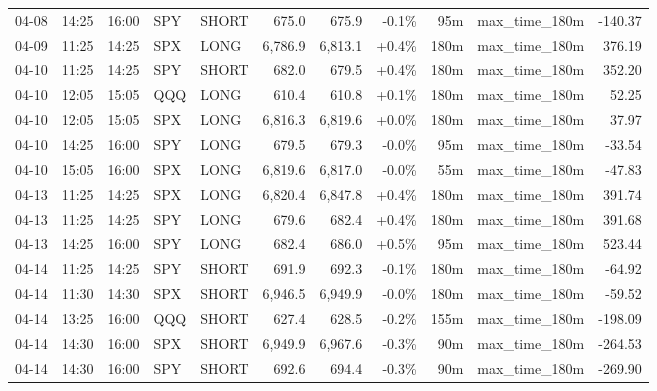 \documentclass[11pt,a4paper,twoside]{article}
\begin{document}
\begin{center}
\begin{longtable}{>{\color{txtmain}}l l l l l r r r r >{\color{txtmain}}l r}
04-08 & 14:25 & 16:00 & SPY & SHORT & 675.0 & 675.9 & \textcolor{lossred}{-0.1\%} & 95m & max\_time\_180m & \textcolor{lossred}{-140.37} \\
04-09 & 11:25 & 14:25 & SPX & LONG & 6,786.9 & 6,813.1 & \textcolor{wingreen}{+0.4\%} & 180m & max\_time\_180m & \textcolor{wingreen}{376.19} \\
04-10 & 11:25 & 14:25 & SPY & SHORT & 682.0 & 679.5 & \textcolor{wingreen}{+0.4\%} & 180m & max\_time\_180m & \textcolor{wingreen}{352.20} \\
04-10 & 12:05 & 15:05 & QQQ & LONG & 610.4 & 610.8 & \textcolor{wingreen}{+0.1\%} & 180m & max\_time\_180m & \textcolor{wingreen}{52.25} \\
04-10 & 12:05 & 15:05 & SPX & LONG & 6,816.3 & 6,819.6 & \textcolor{wingreen}{+0.0\%} & 180m & max\_time\_180m & \textcolor{wingreen}{37.97} \\
04-10 & 14:25 & 16:00 & SPY & LONG & 679.5 & 679.3 & \textcolor{lossred}{-0.0\%} & 95m & max\_time\_180m & \textcolor{lossred}{-33.54} \\
04-10 & 15:05 & 16:00 & SPX & LONG & 6,819.6 & 6,817.0 & \textcolor{lossred}{-0.0\%} & 55m & max\_time\_180m & \textcolor{lossred}{-47.83} \\
04-13 & 11:25 & 14:25 & SPX & LONG & 6,820.4 & 6,847.8 & \textcolor{wingreen}{+0.4\%} & 180m & max\_time\_180m & \textcolor{wingreen}{391.74} \\
04-13 & 11:25 & 14:25 & SPY & LONG & 679.6 & 682.4 & \textcolor{wingreen}{+0.4\%} & 180m & max\_time\_180m & \textcolor{wingreen}{391.68} \\
04-13 & 14:25 & 16:00 & SPY & LONG & 682.4 & 686.0 & \textcolor{wingreen}{+0.5\%} & 95m & max\_time\_180m & \textcolor{wingreen}{523.44} \\
04-14 & 11:25 & 14:25 & SPY & SHORT & 691.9 & 692.3 & \textcolor{lossred}{-0.1\%} & 180m & max\_time\_180m & \textcolor{lossred}{-64.92} \\
04-14 & 11:30 & 14:30 & SPX & SHORT & 6,946.5 & 6,949.9 & \textcolor{lossred}{-0.0\%} & 180m & max\_time\_180m & \textcolor{lossred}{-59.52} \\
04-14 & 13:25 & 16:00 & QQQ & SHORT & 627.4 & 628.5 & \textcolor{lossred}{-0.2\%} & 155m & max\_time\_180m & \textcolor{lossred}{-198.09} \\
04-14 & 14:30 & 16:00 & SPX & SHORT & 6,949.9 & 6,967.6 & \textcolor{lossred}{-0.3\%} & 90m & max\_time\_180m & \textcolor{lossred}{-264.53} \\
04-14 & 14:30 & 16:00 & SPY & SHORT & 692.6 & 694.4 & \textcolor{lossred}{-0.3\%} & 90m & max\_time\_180m & \textcolor{lossred}{-269.90} \\

\end{longtable}
\end{center}
\end{document}
